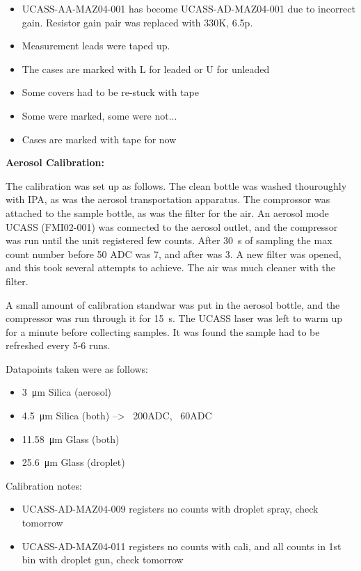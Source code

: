 

\begin{itemize}
\item UCASS-AA-MAZ04-001 has become UCASS-AD-MAZ04-001 due to incorrect gain. Resistor gain pair was replaced with 330K, 6.5p.
\item Measurement leads were taped up.
\item The cases are marked with L for leaded or U for unleaded
\item Some covers had to be re-stuck with tape
\item Some were marked, some were not...
\item Cases are marked with tape for now
\end{itemize}

\textbf{Aerosol Calibration:}

The calibration was set up as follows. The clean bottle was washed thouroughly with IPA, as was the aerosol transportation apparatus. The comprossor was attached to the sample bottle, as was the filter for the air. An aerosol mode UCASS (FMI02-001) was connected to the aerosol outlet, and the compressor was run until the unit registered few counts. After \SI{30}{\second} of sampling the max count number before 50 ADC was 7, and after was 3. A new filter was opened, and this took several attempts to achieve. The air was much cleaner with the filter.

A small amount of calibration standwar was put in the aerosol bottle, and the compressor was run through it for \SI{15}{\second}. The UCASS laser was left to warm up for a minute before collecting samples. It was found the sample had to be refreshed every 5-6 runs.

Datapoints taken were as follows:
\begin{itemize}
\item \SI{3}{\micro\metre} Silica (aerosol)
\item \SI{4.5}{\micro\metre} Silica (both) --> ~200ADC, ~60ADC
\item \SI{11.58}{\micro\metre} Glass (both)
\item \SI{25.6}{\micro\metre} Glass (droplet)
\end{itemize}

Calibration notes:
\begin{itemize}
\item UCASS-AD-MAZ04-009 registers no counts with droplet spray, check tomorrow
\item UCASS-AD-MAZ04-011 registers no counts with cali, and all counts in 1st bin with droplet gun, check tomorrow
\end{itemize}
